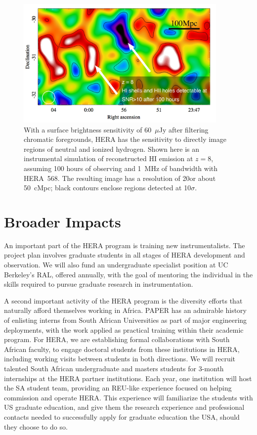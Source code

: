 \documentclass[preprint]{aastex}
\def\HI{{H{\small I }}}
\begin{document}
\begin{figure}[t] \centering
\includegraphics[height=2.5in]{plots/HERA_z8_SNR_wide_annotated.jpg}
\caption{\small 
With a surface brightness sensitivity of 60~$\mu$Jy after filtering chromatic
foregrounds, HERA has the sensitivity
to directly image regions of neutral and ionized hydrogen.
Shown here is an instrumental simulation of reconstructed \HI emission at $z=8$,
assuming 100 hours of observing and 1~MHz of bandwidth with HERA~568.  The resulting
image has a resolution of 20\arcmin or about 50~cMpc; black contours
enclose regions detected at 10$\sigma$.
\label{imaging}}
\end{figure}

\vspace{-0.25in}
\section{Broader Impacts}
\label{BIsec}

An important part of the HERA program is training new
instrumentalists.  The project plan involves graduate students in all
stages of HERA development and observation. We will also fund an
undergraduate specialist position
at UC Berkeley's RAL, offered annually, with the goal of
mentoring the individual in the skills required to pursue graduate
research in instrumentation.

A second important activity of the HERA program is the diversity
efforts that naturally afford themselves working in Africa. PAPER has
an admirable history of enlisting interns from South African
Universities as part of major engineering deployments, with the work
applied as practical training within their academic program.
For HERA, we are establishing formal collaborations with South African
faculty, to engage doctoral students from these institutions in HERA,
including working visits between students in both directions. We will
recruit talented South African undergraduate and masters students for
3-month internships at the HERA partner institutions. Each year, one
institution will host the SA student team, providing an REU-like
experience focused on helping commission and operate HERA. This
experience will familiarize the students with US graduate education,
and give them the research experience and professional contacts needed
to successfully apply for graduate education the USA, should they
choose to do so.
\end{document}
